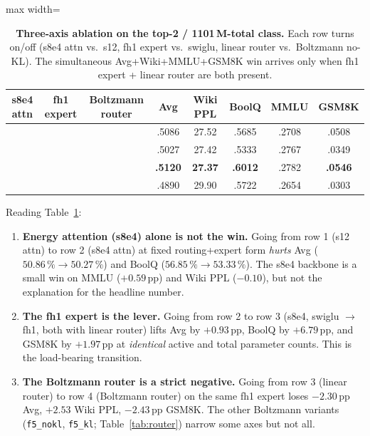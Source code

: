\documentclass[oneside]{article}
\begin{document}
\begin{table}[t]
\centering
\caption{\textbf{Three-axis ablation on the top-2 / 1101\,M-total
class.} Each row turns on/off (s8e4 attn vs.\ s12, fh1 expert vs.\
swiglu, linear router vs.\ Boltzmann no-KL). The simultaneous
Avg+Wiki+MMLU+GSM8K win arrives only when fh1 expert + linear router
are both present.}
\label{tab:abl}
\begin{adjustbox}{max width=\textwidth}
\begin{tabular}{ccc|c|c|c|c|c}
\toprule
\textbf{s8e4 attn} & \textbf{fh1 expert} & \textbf{Boltzmann router} & \textbf{Avg} & \textbf{Wiki PPL} & \textbf{BoolQ} & \textbf{MMLU} & \textbf{GSM8K} \\
\midrule
            &            &            & .5086 & 27.52 & .5685 & .2708 & .0508 \\
\checkmark  &            &            & .5027 & 27.42 & .5333 & .2767 & .0349 \\
\midrule
\rowcolor{green!15}
\checkmark  & \checkmark &            & \textbf{.5120} & \textbf{27.37} & \textbf{.6012} & .2782 & \textbf{.0546} \\
\midrule
\checkmark  & \checkmark & \checkmark & .4890 & 29.90 & .5722 & .2654 & .0303 \\
\bottomrule
\end{tabular}
\end{adjustbox}
\end{table}

Reading Table~\ref{tab:abl}:
\begin{enumerate}[leftmargin=1.5em]
  \item \textbf{Energy attention (s8e4) alone is not the win.} Going
        from row 1 (s12 attn) to row 2 (s8e4 attn) at fixed
        routing+expert form \emph{hurts} Avg ($50.86\,\%\to 50.27\,\%$)
        and BoolQ ($56.85\,\%\to 53.33\,\%$). The s8e4 backbone is a
        small win on MMLU ($+0.59\,$pp) and Wiki PPL ($-0.10$), but
        not the explanation for the headline number.
  \item \textbf{The fh1 expert is the lever.} Going from row 2 to row
        3 (s8e4, swiglu $\to$ fh1, both with linear router) lifts Avg
        by $+0.93\,$pp, BoolQ by $+6.79\,$pp, and GSM8K by
        $+1.97\,$pp at \emph{identical} active and total parameter
        counts. This is the load-bearing transition.
  \item \textbf{The Boltzmann router is a strict negative.} Going
        from row 3 (linear router) to row 4 (Boltzmann router) on the
        same fh1 expert loses $-2.30\,$pp Avg, $+2.53$ Wiki PPL,
        $-2.43\,$pp GSM8K. The other Boltzmann variants
        (\texttt{f5\_nokl}, \texttt{f5\_kl}; Table~\ref{tab:router})
        narrow some axes but not all.
\end{enumerate}
\end{document}
